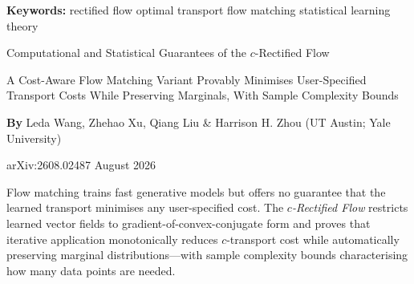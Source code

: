 \documentclass[10pt,twocolumn]{article}
\begin{document}
\setlength{\parindent}{0pt}
\setlength{\parskip}{4pt}

{\small\color{keywordgray}\textbf{Keywords:}
  rectified flow \textbullet{}
  optimal transport \textbullet{}
  flow matching \textbullet{}
  statistical learning theory}\par\vspace{4pt}

{\LARGE\bfseries\raggedright
  Computational and Statistical Guarantees of the $c$-Rectified Flow}\par\vspace{4pt}

{\large\itshape\raggedright
  A Cost-Aware Flow Matching Variant Provably Minimises User-Specified Transport
  Costs While Preserving Marginals, With Sample Complexity Bounds}\par\vspace{6pt}

{\small\textbf{By} Leda Wang, Zhehao Xu, Qiang Liu \& Harrison H. Zhou
  (UT Austin; Yale University)}\par\vspace{2pt}

{\small\color{keywordgray}arXiv:2608.02487 \textbullet{} August 2026}
\par\vspace{2pt}\noindent{\color{rulered}\rule{\columnwidth}{0.6pt}}\vspace{6pt}

Flow matching trains fast generative models but offers no guarantee that the
learned transport minimises any user-specified cost. The \textit{$c$-Rectified Flow}
restricts learned vector fields to gradient-of-convex-conjugate form and proves
that iterative application monotonically reduces $c$-transport cost while
automatically preserving marginal distributions---with sample complexity bounds
characterising how many data points are needed.
\end{document}
